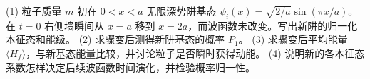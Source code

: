(1) 粒子质量 \(m\) 初在 \(0<x<a\) 无限深势阱基态 \(\psi_i(x)=\sqrt{2/a}\sin(\pi x/a)\)。在 \(t=0\) 右侧墙瞬间从 \(x=a\) 移到 \(x=2a\)，而波函数未改变。写出新阱的归一化本征态和能级。
(2) 求骤变后测得新阱基态的概率 \(P_1\)。
(3) 求骤变后平均能量 \(\langle H_f\rangle\)，与新基态能量比较，并讨论粒子是否瞬时获得动能。
(4) 说明新的各本征态系数怎样决定后续波函数时间演化，并检验概率归一性。
